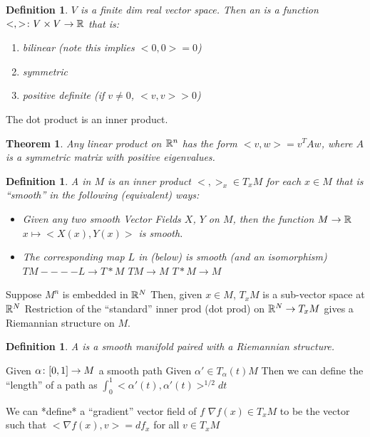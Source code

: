 \documentclass[11pt]{amsbook}
\theoremstyle{mystyle} %
\newtheorem{thrm}[thm]{Theorem}
\newtheorem{defi}[thm]{Definition}
\numberwithin{thm}{section}
\newcommand{\x}{\times}
\newcommand{\grad}{\nabla}
\begin{document}
\begin{defi}
	$V$ is a finite dim real vector space.  Then an  is a function $<,> \from V \x V \to \R$ that is:
	\begin{enumerate}
		\item bilinear (note this implies $<0,0> = 0$)
		\item symmetric
		\item positive definite (if $v \neq 0$, $<v,v> > 0$)
	\end{enumerate}
\end{defi}
\begin{example}
	The dot product is an inner product.
\end{example}
\begin{thrm}
	Any linear product on ${\mathbb R}^n$ has the form $<v,w> = v^T A w$, where $A$ is a symmetric matrix with positive eigenvalues.
\end{thrm}
\begin{defi}
	A  in $M$ is an inner product $<,>_x \in T_xM$ for each $x \in M$ that is ``smooth'' in the following (equivalent) ways:
	\begin{itemize}
		\item
		Given any two smooth Vector Fields $X$, $Y$ on $M$, then
		the function $M \to {\mathbb R}$
		$x \mapsto <X(x), Y(x)>$
		is smooth.
		\item
		The corresponding map $L$ in (below) is smooth (and an isomorphism)
		$TM ----L\to T*M$
		$TM \to M$
		$T*M \to M$
	\end{itemize}
\end{defi}
\begin{example}
	Suppose $M^n$ is embedded in ${\mathbb R}^N$
	Then, given $x \in M$, $T_xM$ is a sub-vector space at ${\mathbb R}^N$
	Restriction of the ``standard'' inner prod (dot prod) on ${\mathbb R}^N \to T_xM$ gives a Riemannian structure on $M$.
\end{example}
\begin{defi}
	A  is a smooth manifold paired with a Riemannian structure.
\end{defi}
\begin{example}
	Given $\alpha \colon [0,1] \to M$ a smooth path
	Given $\alpha' \in T_\alpha(t)M$
	Then we can define the ``length'' of a path as $\int_0^1 <\alpha'(t), \alpha'(t)>^{1/2} dt$
\end{example}
\begin{example}
	We can *define* a ``gradient'' vector field of $f$
	$\grad f(x) \in T_xM$ to be the vector such that
	$< \grad f (x), v > = df_x$ for all $v \in T_xM$
\end{example}
\end{document}
